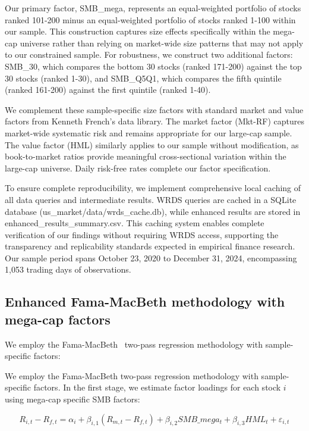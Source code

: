 \documentclass[10pt,letterpaper]{article}
\begin{document}
Our primary factor, SMB\_mega, represents an equal-weighted portfolio of stocks ranked 101-200 minus an equal-weighted portfolio of stocks ranked 1-100 within our sample. This construction captures size effects specifically within the mega-cap universe rather than relying on market-wide size patterns that may not apply to our constrained sample. For robustness, we construct two additional factors: SMB\_30, which compares the bottom 30 stocks (ranked 171-200) against the top 30 stocks (ranked 1-30), and SMB\_Q5Q1, which compares the fifth quintile (ranked 161-200) against the first quintile (ranked 1-40).

We complement these sample-specific size factors with standard market and value factors from Kenneth French's data library. The market factor (Mkt-RF) captures market-wide systematic risk and remains appropriate for our large-cap sample. The value factor (HML) similarly applies to our sample without modification, as book-to-market ratios provide meaningful cross-sectional variation within the large-cap universe. Daily risk-free rates complete our factor specification.

To ensure complete reproducibility, we implement comprehensive local caching of all data queries and intermediate results. WRDS queries are cached in a SQLite database (us\_market/data/wrds\_cache.db), while enhanced results are stored in enhanced\_results\_summary.csv. This caching system enables complete verification of our findings without requiring WRDS access, supporting the transparency and replicability standards expected in empirical finance research. Our sample period spans October 23, 2020 to December 31, 2024, encompassing 1,053 trading days of observations.

\subsection*{Enhanced Fama-MacBeth methodology with mega-cap factors}

We employ the Fama-MacBeth~\cite{fama1973} two-pass regression methodology with sample-specific factors:

We employ the Fama-MacBeth two-pass regression methodology with sample-specific factors. In the first stage, we estimate factor loadings for each stock $i$ using mega-cap specific SMB factors:

\begin{equation}
R_{i,t} - R_{f,t} = \alpha_i + \beta_{i,1}(R_{m,t} - R_{f,t}) + \beta_{i,2}SMB\_mega_t + \beta_{i,3}HML_t + \varepsilon_{i,t}
\label{eq:stage1}
\end{equation}
\end{document}
